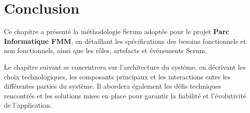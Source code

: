 \section*{Conclusion}
\label{sec:conclusion_methodologie}

Ce chapitre a présenté la méthodologie Scrum adoptée pour le projet \textbf{Parc Informatique FMM}, en détaillant les spécifications des besoins fonctionnels et non fonctionnels, ainsi que les rôles, artefacts et événements Scrum.

Le chapitre suivant se concentrera sur l’architecture du système, en décrivant les choix technologiques, les composants principaux et les interactions entre les différentes parties du système. Il abordera également les défis techniques rencontrés et les solutions mises en place pour garantir la fiabilité et l’évolutivité de l’application.






